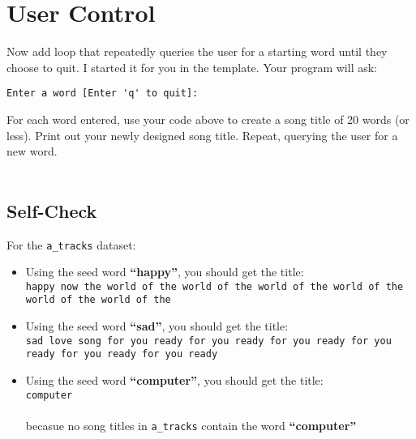 \documentclass{article}
\begin{document}
\section*{User Control}
Now add loop that repeatedly queries the user for a starting word until they choose to quit. I started it for you in the template. Your program will ask:
\begin{center}
 \verb|Enter a word [Enter 'q' to quit]:|
\end{center}
For each word entered, use your code above to create a song title of 20 words (or less). Print out your newly designed song title. Repeat, querying the user for a new word.
\\\\
\begin{tcolorbox}
 \section*{Self-Check}
 For the \verb|a_tracks| dataset:
 \begin{itemize}
  \item Using the seed word \textbf{``happy''}, you should get the title:
  \\{\small \verb|happy now the world of the world of the world of the world of the world of the world of the|}
  \item Using the seed word \textbf{``sad''}, you should get the title:
  \\{\small \verb|sad love song for you ready for you ready for you ready for you ready for you ready for you ready|}
  \item Using the seed word \textbf{``computer''}, you should get the title:
  \\\verb|computer|
  \\\\becasue no song titles in \verb|a_tracks| contain the word \textbf{``computer''}
 \end{itemize}

 
\end{tcolorbox}
\end{document}
